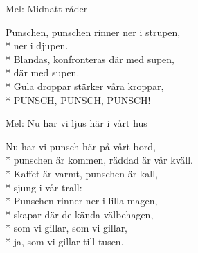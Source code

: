 \begin{SongText}
    \begin{SongInfo}
        Mel: Midnatt råder
    \end{SongInfo}
    \begin{SongVerse}
        Punschen, punschen rinner ner i strupen,\\*%
        ner i djupen.\\*%
        Blandas, konfronteras där med supen,\\*%
        där med supen.\\*%
        Gula droppar stärker våra kroppar,\\*%
        PUNSCH, PUNSCH, PUNSCH!
    \end{SongVerse}\end{SongText}
\begin{SongText}
    \begin{SongInfo}
        Mel: Nu har vi ljus här i vårt hus
    \end{SongInfo}
    \begin{SongVerse}
        Nu har vi punsch här på vårt bord,\\*%
        punschen är kommen, räddad är vår kväll.\\*%
        Kaffet är varmt, punschen är kall,\\*%
        sjung i vår trall:\\*%
        Punschen rinner ner i lilla magen,\\*%
        skapar där de kända välbehagen,\\*%
        som vi gillar, som vi gillar,\\*%
        ja, som vi gillar till tusen.
    \end{SongVerse}\end{SongText}
